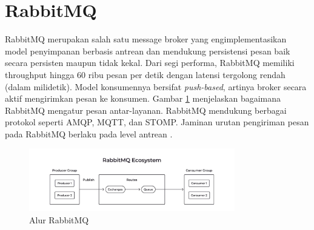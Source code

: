 \section{RabbitMQ}

RabbitMQ merupakan salah satu message broker yang engimplementasikan model penyimpanan berbasis antrean dan mendukung persistensi pesan baik secara persisten maupun tidak kekal. Dari segi performa, RabbitMQ memiliki throughput hingga 60 ribu pesan per detik dengan latensi tergolong rendah (dalam milidetik). Model konsumennya bersifat \textit{push-based}, artinya broker secara aktif mengirimkan pesan ke konsumen. Gambar \ref{fig:rabbitmq-flow} menjelaskan bagaimana RabbitMQ mengatur pesan antar-layanan. RabbitMQ mendukung berbagai protokol seperti AMQP, MQTT, dan STOMP. Jaminan urutan pengiriman pesan pada RabbitMQ berlaku pada level antrean \parencite{arshadChoosingTheRightMessaging}.

\begin{figure}[H]
    \centering
    \includegraphics[width=0.8\textwidth]{resources/chapter-2/rabbitmq.jpeg}
    \caption{Alur RabbitMQ \parencite{royNatsRmqKafka}}
    \label{fig:rabbitmq-flow}
\end{figure}
